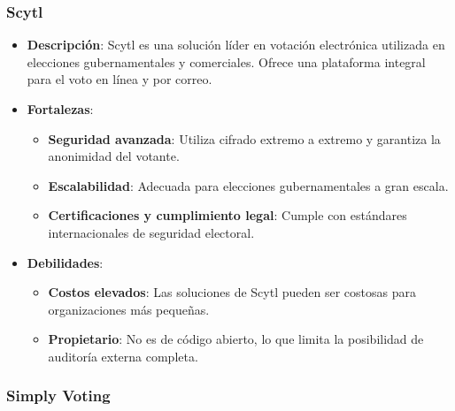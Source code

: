 \documentclass{article}
\begin{document}
\subsubsection{Scytl}
\begin{itemize}
    \item \textbf{Descripción}: Scytl es una solución líder en votación electrónica utilizada en elecciones gubernamentales y comerciales. Ofrece una plataforma integral para el voto en línea y por correo.
    \item \textbf{Fortalezas}:
    \begin{itemize}
        \item \textbf{Seguridad avanzada}: Utiliza cifrado extremo a extremo y garantiza la anonimidad del votante.
        \item \textbf{Escalabilidad}: Adecuada para elecciones gubernamentales a gran escala.
        \item \textbf{Certificaciones y cumplimiento legal}: Cumple con estándares internacionales de seguridad electoral.
    \end{itemize}
    \item \textbf{Debilidades}:
    \begin{itemize}
        \item \textbf{Costos elevados}: Las soluciones de Scytl pueden ser costosas para organizaciones más pequeñas.
        \item \textbf{Propietario}: No es de código abierto, lo que limita la posibilidad de auditoría externa completa.
    \end{itemize}
\end{itemize}

\subsubsection{Simply Voting}
\end{document}
